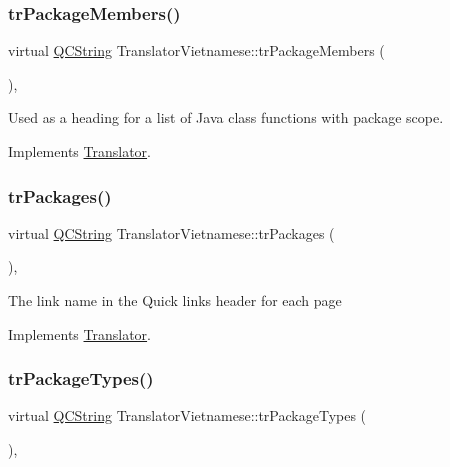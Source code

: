 \subsubsection{\texorpdfstring{trPackageMembers()}{trPackageMembers()}}
{\footnotesize\ttfamily virtual \mbox{\hyperlink{class_q_c_string}{Q\+C\+String}} Translator\+Vietnamese\+::tr\+Package\+Members (\begin{DoxyParamCaption}{ }\end{DoxyParamCaption})\hspace{0.3cm}{\ttfamily [inline]}, {\ttfamily [virtual]}}

Used as a heading for a list of Java class functions with package scope. 

Implements \mbox{\hyperlink{class_translator}{Translator}}.

\mbox{\label{class_translator_vietnamese_a747c01dbc32c9accdb064a090a5fc2c2}} 
\subsubsection{\texorpdfstring{trPackages()}{trPackages()}}
{\footnotesize\ttfamily virtual \mbox{\hyperlink{class_q_c_string}{Q\+C\+String}} Translator\+Vietnamese\+::tr\+Packages (\begin{DoxyParamCaption}{ }\end{DoxyParamCaption})\hspace{0.3cm}{\ttfamily [inline]}, {\ttfamily [virtual]}}

The link name in the Quick links header for each page 

Implements \mbox{\hyperlink{class_translator}{Translator}}.

\mbox{\label{class_translator_vietnamese_ab05f0d5c4c8aded66988273c6d1e322a}} 
\subsubsection{\texorpdfstring{trPackageTypes()}{trPackageTypes()}}
{\footnotesize\ttfamily virtual \mbox{\hyperlink{class_q_c_string}{Q\+C\+String}} Translator\+Vietnamese\+::tr\+Package\+Types (\begin{DoxyParamCaption}{ }\end{DoxyParamCaption})\hspace{0.3cm}{\ttfamily [inline]}, {\ttfamily [virtual]}}

